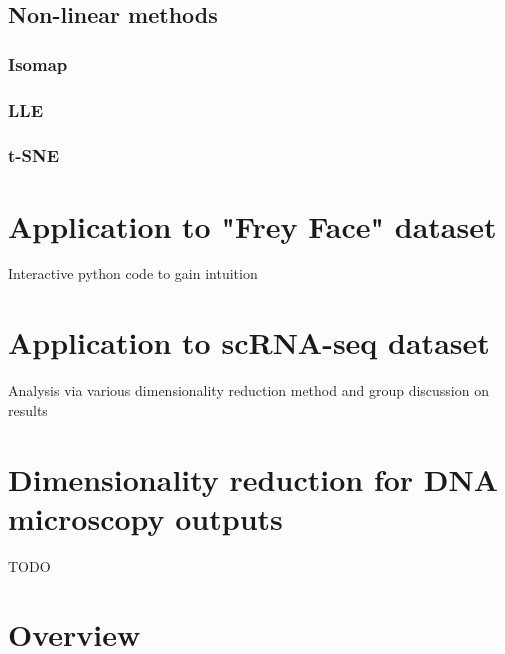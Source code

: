 \documentclass[11pt]{article}
\begin{document}
\subsection{Non-linear methods}

\subsubsection{Isomap}

\subsubsection{LLE}

\subsubsection{t-SNE}


\section{Application to "Frey Face" dataset}

Interactive python code to gain intuition

\section{Application to scRNA-seq dataset}

Analysis via various dimensionality reduction method and group discussion on results

\section{Dimensionality reduction for DNA microscopy outputs}

TODO


\section{Overview}




\end{document}
